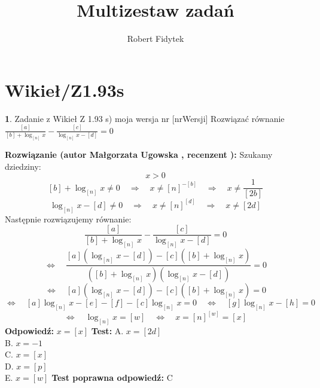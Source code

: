 \documentclass[12pt, a4paper]{article}
\title{Multizestaw zadań}
\author{Robert Fidytek}
\date{}
\theoremstyle{definition} %
\newtheorem{zad}{}
\newcommand{\kategoria}[1]{\section{#1}} %
\newcommand{\zadStart}[1]{\begin{zad}#1\newline} %
\newcommand{\zadStop}{\end{zad}}   %
\newcommand{\rozwStart}[2]{\noindent \textbf{Rozwiązanie (autor #1 , recenzent #2): }\newline} %
\newcommand{\rozwStop}{\newline}                                            %
\newcommand{\odpStart}{\noindent \textbf{Odpowiedź:}\newline}    %
\newcommand{\odpStop}{\newline}                                             %
\newcommand{\testStart}{\noindent \textbf{Test:}\newline} %
\newcommand{\testStop}{\newline} %
\newcommand{\kluczStart}{\noindent \textbf{Test poprawna odpowiedź:}\newline} %
\newcommand{\kluczStop}{\newline} %
\begin{document}
\maketitle


\kategoria{Wikieł/Z1.93s}
\zadStart{Zadanie z Wikieł Z 1.93 s) moja wersja nr [nrWersji]}
Rozwiązać równanie $\frac{[a]}{[b]+\log_{[n]}{x}} - \frac{[c]}{\log_{[n]}{x}-[d]} = 0$
\zadStop
\rozwStart{Małgorzata Ugowska}{}
Szukamy dziedziny:
$$x>0$$
$$[b]+\log_{[n]}{x} \ne 0 \quad \Longrightarrow \quad x \ne {[n]}^{-[b]} \quad \Longrightarrow \quad x \ne \frac{1}{[2b]}$$
$$\log_{[n]}{x} - [d] \ne 0 \quad \Longrightarrow \quad x \ne {[n]}^{[d]} \quad \Longrightarrow \quad x \ne [2d]$$
Następnie rozwiązujemy równanie:
$$\frac{[a]}{[b]+\log_{[n]}{x}} - \frac{[c]}{\log_{[n]}{x}-[d]} = 0 $$
$$ \Longleftrightarrow \quad \frac{[a](\log_{[n]}{x}-[d])-[c]([b]+\log_{[n]}{x})}{([b]+\log_{[n]}{x})(\log_{[n]}{x}-[d])}= 0 $$
$$\Longleftrightarrow \quad  [a](\log_{[n]}{x}-[d])-[c]([b]+\log_{[n]}{x}) = 0 $$
$$ \Longleftrightarrow \quad [a]\log_{[n]}{x}-[e] - [f]-[c]\log_{[n]}{x}= 0 \quad \Longleftrightarrow \quad [g]\log_{[n]}{x}-[h]=0$$
$$ \Longleftrightarrow \quad \log_{[n]}{x}=[w] \quad \Longleftrightarrow \quad x = {[n]}^{[w]} = [x]$$
\rozwStop
\odpStart
$x = [x]$
\odpStop
\testStart
A. $x = [2d]$\\
B. $x = - 1$\\
C. $x = [x]$\\
D. $x =[p]$\\
E. $x = [w]$
\testStop
\kluczStart
C
\kluczStop
\end{document}
